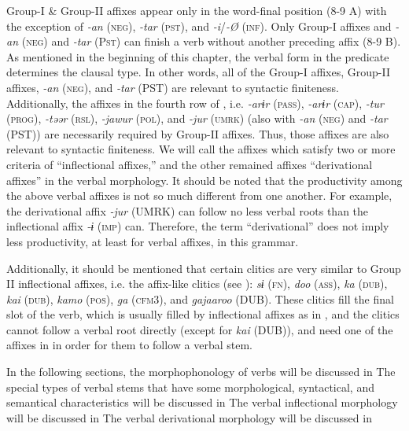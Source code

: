 Group-I \& Group-II affixes appear only in the word-final position (8-9 A) with the exception of \textit{-an} (\textsc{neg}), \textit{-tar} (\textsc{pst}), and \textit{-i}/\textit{-Ø} (\textsc{inf}). Only Group-I affixes and \textit{-an} (\textsc{neg}) and \textit{-tar} (P\textsc{st}) can finish a verb without another preceding affix (8-9 B). As mentioned in the beginning of this chapter, the verbal form in the predicate determines the clausal type. In other words, all of the Group-I affixes, Group-II affixes, \textit{-an} (\textsc{neg}), and \textit{-tar} (PST) are relevant to syntactic finiteness. Additionally, the affixes in the fourth row of , i.e. \textit{-arɨr} (\textsc{pass}), \textit{-arɨr} (\textsc{cap}), \textit{-tur} (\textsc{prog}), \textit{-təər} (\textsc{rsl}), \textit{-jawur} (\textsc{pol}), and \textit{-jur} (\textsc{umrk}) (also with \textit{-an} (\textsc{neg}) and \textit{-tar} (PST)) are necessarily required by Group-II affixes. Thus, those affixes are also relevant to syntactic finiteness. We will call the affixes which satisfy two or more criteria of  “inflectional affixes,” and the other remained affixes “derivational affixes” in the verbal morphology. It should be noted that the productivity among the above verbal affixes is not so much different from one another. For example, the derivational affix \textit{-jur} (UMRK) can follow no less verbal roots than the inflectional affix \textit{-ɨ} (\textsc{imp}) can. Therefore, the term “derivational” does not imply less productivity, at least for verbal affixes, in this grammar.

  Additionally, it should be mentioned that certain clitics are very similar to Group II inflectional affixes, i.e. the affix-like clitics (see ): \textit{sɨ} (\textsc{fn}), \textit{doo} (\textsc{ass}), \textit{ka} (\textsc{dub}), \textit{kai} (\textsc{dub}), \textit{kamo} (\textsc{pos}), \textit{ga} (\textsc{cfm3}), and \textit{gajaaroo} (DUB). These clitics fill the final slot of the verb, which is usually filled by inflectional affixes as in , and the clitics cannot follow a verbal root directly (except for \textit{kai} (DUB)), and need one of the affixes in  in order for them to follow a verbal stem.

  In the following sections, the morphophonology of verbs will be discussed in  The special types of verbal stems that have some morphological, syntactical, and semantical characteristics will be discussed in  The verbal inflectional morphology will be discussed in  The verbal derivational morphology will be discussed in 


